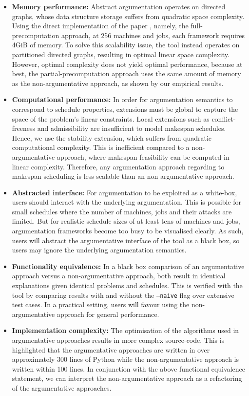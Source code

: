 \begin{itemize}
	\item\textbf{Memory performance:} Abstract argumentation operates on directed graphs, whose data structure storage suffers from quadratic space complexity. Using the direct implementation of the paper \cite{aes}, namely, the full-precomputation approach, at 256 machines and jobs, each framework requires 4GiB of memory. To solve this scalability issue, the tool instead operates on partitioned directed graphs, resulting in optimal linear space complexity. However, optimal complexity does not yield optimal performance, because at best, the partial-precomputation approach uses the same amount of memory as the non-argumentative approach, as shown by our empirical results.
	\item\textbf{Computational performance:} In order for argumentation semantics to correspond to schedule properties, extensions must be global to capture the space of the problem's linear constraints. Local extensions such as conflict-freeness and admissibility are insufficient to model makespan schedules. Hence, we use the stability extension, which suffers from quadratic computational complexity. This is inefficient compared to a non-argumentative approach, where makespan feasibility can be computed in linear complexity. Therefore, any argumentation approach regarding to makespan scheduling is less scalable than an non-argumentative approach.
	\item\textbf{Abstracted interface:} For argumentation to be exploited as a white-box, users should interact with the underlying argumentation. This is possible for small schedules where the number of machines, jobs and their attacks are limited. But for realistic schedule sizes of at least tens of machines and jobs, argumentation frameworks become too busy to be visualised clearly. As such, users will abstract the argumentative interface of the tool as a black box, so users may ignore the underlying argumentation semantics.
	\item\textbf{Functionality equivalence:} In a black box comparison of an argumentative approach versus a non-argumentative approach, both result in identical explanations given identical problems and schedules. This is verified with the tool by comparing results with and without the \texttt{--naive} flag over extensive test cases. In a practical setting, users will favour using the non-argumentative approach for general performance.
	\item\textbf{Implementation complexity: }The optimisation of the algorithms used in argumentative approaches results in more complex source-code. This is highlighted that the argumentative approaches are written in over approximately 300 lines of Python while the non-argumentative approach is written within 100 lines. In conjunction with the above functional equivalence statement, we can interpret the non-argumentative approach as a refactoring of the argumentative approaches.
\end{itemize}


